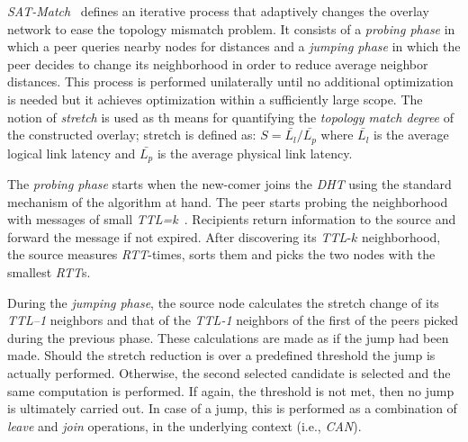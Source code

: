 \emph{SAT-Match}~\cite{RGJZ2004} defines an iterative process that 
adaptively changes the overlay network to ease the topology mismatch problem. 
It consists of a \emph{probing phase} in which a peer queries nearby nodes 
for distances and a \emph{jumping phase} in which the peer decides 
to change its neighborhood in order to reduce average neighbor distances. 
This process is performed unilaterally
until no additional optimization is needed but it achieves optimization within a
sufficiently large scope.
The notion of \emph{stretch} is used as th means for quantifying 
the \emph{topology match degree} of the constructed overlay;
stretch is defined as: 
$S = \bar{L_l}/\bar{L_p}$ where $\bar{L_l}$ is the average logical link
latency and $\bar{L_p}$ is the average physical link latency.
% 

The \emph{probing phase} starts when the new-comer joins the \emph{DHT} 
using the standard mechanism of the algorithm at hand. 
The peer starts probing the neighborhood with 
messages of small \emph{TTL=k}~\cite{jiang_lightflood_2008}. 
Recipients return information to the source and forward the message 
if not expired. 
After discovering its \emph{TTL}-$k$ neighborhood, 
the source measures \emph{RTT}-times, sorts them
and picks the two nodes with the smallest \emph{RTT}s.

During the \emph{jumping phase}, the source node calculates the 
stretch change of its \emph{TTL--1} neighbors %
and that of the \emph{TTL-1} neighbors of the first of
the peers picked during the previous phase. 
These calculations are made as if the jump had been made. 
Should the stretch reduction is over a predefined threshold
the jump is actually performed. Otherwise,
the second selected candidate is selected and the
same computation is performed. 
If again, the threshold is not met, then no jump is ultimately carried out. 
In case of a jump, this is performed as a combination
of \emph{leave} and \emph{join} operations, in the underlying context
(i.e., \emph{CAN}).

